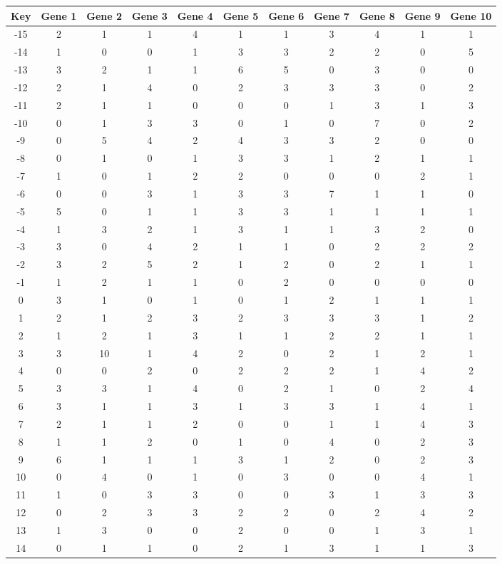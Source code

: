 \begin{tabular}{|c|c|c|c|c|c|c|c|c|c|c|}
\hline
Key & Gene 1 & Gene 2 & Gene 3 & Gene 4 & Gene 5 & Gene 6 & Gene 7 & Gene 8 & Gene 9 & Gene 10 \\
\hline
-15 & 2 & 1 & 1 & 4 & 1 & 1 & 3 & 4 & 1 & 1 \\
-14 & 1 & 0 & 0 & 1 & 3 & 3 & 2 & 2 & 0 & 5 \\
-13 & 3 & 2 & 1 & 1 & 6 & 5 & 0 & 3 & 0 & 0 \\
-12 & 2 & 1 & 4 & 0 & 2 & 3 & 3 & 3 & 0 & 2 \\
-11 & 2 & 1 & 1 & 0 & 0 & 0 & 1 & 3 & 1 & 3 \\
-10 & 0 & 1 & 3 & 3 & 0 & 1 & 0 & 7 & 0 & 2 \\
-9 & 0 & 5 & 4 & 2 & 4 & 3 & 3 & 2 & 0 & 0 \\
-8 & 0 & 1 & 0 & 1 & 3 & 3 & 1 & 2 & 1 & 1 \\
-7 & 1 & 0 & 1 & 2 & 2 & 0 & 0 & 0 & 2 & 1 \\
-6 & 0 & 0 & 3 & 1 & 3 & 3 & 7 & 1 & 1 & 0 \\
-5 & 5 & 0 & 1 & 1 & 3 & 3 & 1 & 1 & 1 & 1 \\
-4 & 1 & 3 & 2 & 1 & 3 & 1 & 1 & 3 & 2 & 0 \\
-3 & 3 & 0 & 4 & 2 & 1 & 1 & 0 & 2 & 2 & 2 \\
-2 & 3 & 2 & 5 & 2 & 1 & 2 & 0 & 2 & 1 & 1 \\
-1 & 1 & 2 & 1 & 1 & 0 & 2 & 0 & 0 & 0 & 0 \\
0 & 3 & 1 & 0 & 1 & 0 & 1 & 2 & 1 & 1 & 1 \\
1 & 2 & 1 & 2 & 3 & 2 & 3 & 3 & 3 & 1 & 2 \\
2 & 1 & 2 & 1 & 3 & 1 & 1 & 2 & 2 & 1 & 1 \\
3 & 3 & 10 & 1 & 4 & 2 & 0 & 2 & 1 & 2 & 1 \\
4 & 0 & 0 & 2 & 0 & 2 & 2 & 2 & 1 & 4 & 2 \\
5 & 3 & 3 & 1 & 4 & 0 & 2 & 1 & 0 & 2 & 4 \\
6 & 3 & 1 & 1 & 3 & 1 & 3 & 3 & 1 & 4 & 1 \\
7 & 2 & 1 & 1 & 2 & 0 & 0 & 1 & 1 & 4 & 3 \\
8 & 1 & 1 & 2 & 0 & 1 & 0 & 4 & 0 & 2 & 3 \\
9 & 6 & 1 & 1 & 1 & 3 & 1 & 2 & 0 & 2 & 3 \\
10 & 0 & 4 & 0 & 1 & 0 & 3 & 0 & 0 & 4 & 1 \\
11 & 1 & 0 & 3 & 3 & 0 & 0 & 3 & 1 & 3 & 3 \\
12 & 0 & 2 & 3 & 3 & 2 & 2 & 0 & 2 & 4 & 2 \\
13 & 1 & 3 & 0 & 0 & 2 & 0 & 0 & 1 & 3 & 1 \\
14 & 0 & 1 & 1 & 0 & 2 & 1 & 3 & 1 & 1 & 3 \\
\hline
\end{tabular}